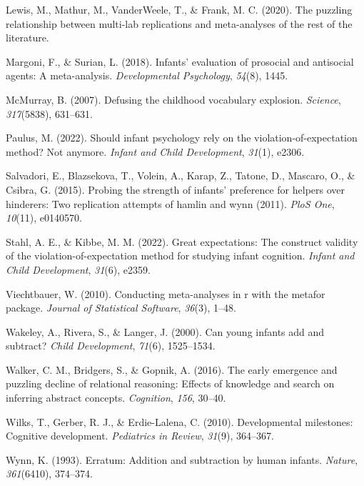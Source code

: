 \documentclass[10pt, letterpaper]{article}
\newenvironment{CSLReferences}%
  {}%
  {\par}
\begin{document}
\begin{CSLReferences}{1}{0}
\leavevmode{}%
Lewis, M., Mathur, M., VanderWeele, T., \& Frank, M. C. (2020). The
puzzling relationship between multi-lab replications and meta-analyses
of the rest of the literature.

\leavevmode{}%
Margoni, F., \& Surian, L. (2018). Infants' evaluation of prosocial and
antisocial agents: A meta-analysis. \emph{Developmental Psychology},
\emph{54}(8), 1445.

\leavevmode{}%
McMurray, B. (2007). Defusing the childhood vocabulary explosion.
\emph{Science}, \emph{317}(5838), 631--631.

\leavevmode{}%
Paulus, M. (2022). Should infant psychology rely on the
violation-of-expectation method? Not anymore. \emph{Infant and Child
Development}, \emph{31}(1), e2306.

\leavevmode{}%
Salvadori, E., Blazsekova, T., Volein, A., Karap, Z., Tatone, D.,
Mascaro, O., \& Csibra, G. (2015). Probing the strength of infants'
preference for helpers over hinderers: Two replication attempts of
hamlin and wynn (2011). \emph{PloS One}, \emph{10}(11), e0140570.

\leavevmode{}%
Stahl, A. E., \& Kibbe, M. M. (2022). Great expectations: The construct
validity of the violation-of-expectation method for studying infant
cognition. \emph{Infant and Child Development}, \emph{31}(6), e2359.

\leavevmode{}%
Viechtbauer, W. (2010). Conducting meta-analyses in r with the metafor
package. \emph{Journal of Statistical Software}, \emph{36}(3), 1--48.

\leavevmode{}%
Wakeley, A., Rivera, S., \& Langer, J. (2000). Can young infants add and
subtract? \emph{Child Development}, \emph{71}(6), 1525--1534.

\leavevmode{}%
Walker, C. M., Bridgers, S., \& Gopnik, A. (2016). The early emergence
and puzzling decline of relational reasoning: Effects of knowledge and
search on inferring abstract concepts. \emph{Cognition}, \emph{156},
30--40.

\leavevmode{}%
Wilks, T., Gerber, R. J., \& Erdie-Lalena, C. (2010). Developmental
milestones: Cognitive development. \emph{Pediatrics in Review},
\emph{31}(9), 364--367.

\leavevmode{}%
Wynn, K. (1993). Erratum: Addition and subtraction by human infants.
\emph{Nature}, \emph{361}(6410), 374--374.

\end{CSLReferences}


\end{document}
